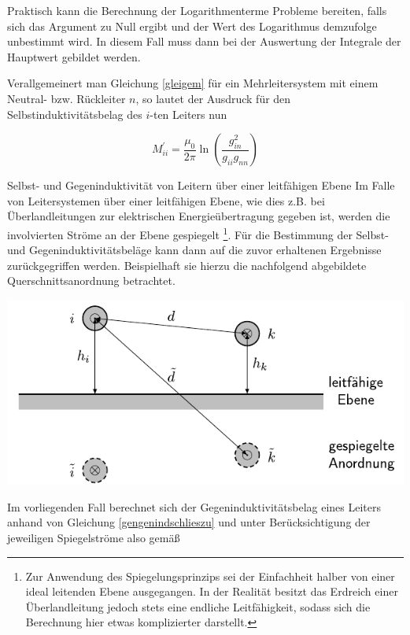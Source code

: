 Praktisch kann die Berechnung der Logarithmenterme Probleme bereiten, falls sich das Argument zu Null ergibt und der Wert des Logarithmus demzufolge unbestimmt wird. In diesem Fall muss dann bei der Auswertung der Integrale der Hauptwert gebildet werden.

Verallgemeinert man Gleichung \ref{gleigem} für ein Mehrleitersystem mit einem Neutral- bzw. Rückleiter $n$, so lautet der Ausdruck für den Selbstinduktivitätsbelag des $i$-ten Leiters nun


\begin{equation}
	M_{i i}^{\prime}=\frac{\mu_{0}}{2 \pi} \ln \left(\frac{g_{i n}^{2}}{g_{i i} g_{n n}}\right) 
\end{equation}


Selbst- und Gegeninduktivität von Leitern über einer leitfähigen Ebene Im Falle von Leitersystemen über einer leitfähigen Ebene, wie dies z.B. bei Überlandleitungen zur elektrischen Energieübertragung gegeben ist, werden die involvierten Ströme an der Ebene gespiegelt \footnote{Zur Anwendung des Spiegelungsprinzips sei der Einfachheit halber von einer ideal leitenden Ebene ausgegangen. In der Realität besitzt das Erdreich einer Überlandleitung jedoch stets eine endliche Leitfähigkeit, sodass sich die Berechnung hier etwas komplizierter darstellt.}. Für die Bestimmung der Selbst- und Gegeninduktivitätsbeläge kann dann auf die zuvor erhaltenen Ergebnisse zurückgegriffen werden. Beispielhaft sie hierzu die nachfolgend abgebildete Querschnittsanordnung betrachtet.

\begin{center}
	\includegraphics{res/LT12}
\end{center}


Im vorliegenden Fall berechnet sich der Gegeninduktivitätsbelag eines Leiters anhand von Gleichung \ref{gengenindschlieszu} und unter Berücksichtigung der jeweiligen Spiegelströme also gemäß


